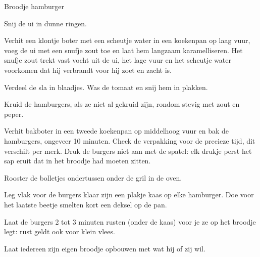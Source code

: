 \begin{recipe}{Broodje hamburger}
\begin{steps}
  \item Snij de ui in dunne ringen.
  \item Verhit een klontje boter met een scheutje water in een koekenpan op laag
        vuur, voeg de ui met een snufje zout toe en laat hem langzaam
        karamelliseren. Het snufje zout trekt vast vocht uit de ui, het lage vuur
        en het scheutje water voorkomen dat hij verbrandt voor hij zoet en zacht
        is.
  \item Verdeel de sla in blaadjes. Was de tomaat en snij hem in plakken.
  \item Kruid de hamburgers, als ze niet al gekruid zijn, rondom stevig met zout en
        peper.
  \item Verhit bakboter in een tweede koekenpan op middelhoog vuur en bak de
        hamburgers, ongeveer 10 minuten. Check de verpakking voor de precieze tijd,
        dit verschilt per merk. Druk de burgers niet aan met de spatel: elk drukje
        perst het sap eruit dat in het broodje had moeten zitten.
  \item Rooster de bolletjes ondertussen onder de gril in de oven.
  \item Leg vlak voor de burgers klaar zijn een plakje kaas op elke hamburger. Doe
        voor het laatste beetje smelten kort een deksel op de pan.
  \item Laat de burgers 2 tot 3 minuten rusten (onder de kaas) voor je ze op het
        broodje legt: rust geldt ook voor klein vlees.
  \item Laat iedereen zijn eigen broodje opbouwen met wat hij of zij wil.
\end{steps}

\end{recipe}
